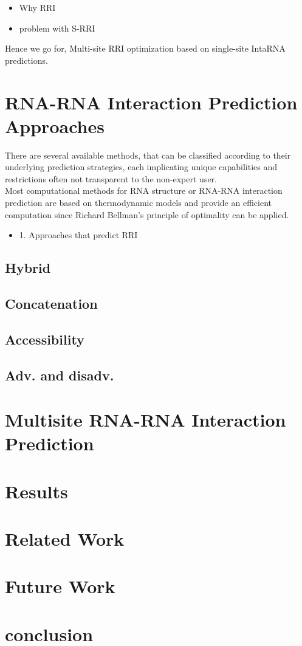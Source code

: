 \documentclass[twoside,a4paper]{report}
\begin{document}
 	\begin{itemize}
 	\item Why RRI
 	\item problem with S-RRI
 	\end{itemize}
 
 	Hence we go for, Multi-site RRI optimization based on single-site IntaRNA predictions.


	\chapter{RNA-RNA Interaction Prediction Approaches}
	There are several available methods, that can be classified according to their underlying prediction strategies, each implicating unique capabilities and restrictions often not transparent to the non-expert user.\\ 
	Most computational methods for RNA structure or RNA-RNA interaction prediction
	are based on thermodynamic models and provide an efficient computation since Richard Bellman’s principle of optimality \cite{raden2018interactive} can be applied.
	
	\begin{itemize}
	\item 1. Approaches that predict RRI
	\end{itemize}
	
	\section{Hybrid}
	\section{Concatenation}
	\section{Accessibility}
	\section{Adv. and disadv.}
	
	\chapter{Multisite RNA-RNA Interaction Prediction }
	\chapter{Results}
	\chapter{Related Work}
	\chapter{Future Work}
	\chapter{conclusion}
	
	
	

	
\end{document}
